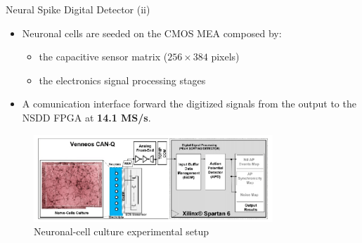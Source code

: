 \documentclass{beamer}
\begin{document}
\begin{frame}{Neural Spike Digital Detector (ii)}
\begin{itemize}
    \item Neuronal cells are seeded on the CMOS MEA composed by: 
    \begin{itemize}
        \item the capacitive sensor matrix ($256 \times 384$ pixels)
        \item the electronics signal processing stages
    \end{itemize}
    \item A comunication interface forward the digitized signals from the output to the NSDD FPGA at \textbf{14.1 MS/s}.
\end{itemize}
\begin{figure}
    \centering   
    \vspace{-0.4cm}
    \includegraphics[width=9cm]{structure.png}
    \caption{Neuronal-cell culture experimental setup}
\end{figure}
\end{frame}
\end{document}

